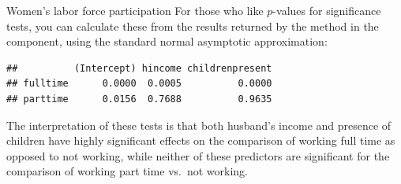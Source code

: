 \documentclass[11pt]{book}
\renewenvironment{knitrout}{\small\renewcommand{\baselinestretch}{.85}}{} %
\begin{document}
\begin{Example}[wlfpart2]{Women's labor force participation}
For those who like $p$-values for significance tests, you can calculate these from the
results returned by the  method in the  component,
using the standard normal asymptotic approximation:
\begin{knitrout}
\color{fgcolor}\begin{kframe}
\begin{alltt}
 \hlkwb{<-}  \hlstd{=}\hlstd{)}
 \hlkwb{<-} \hlopt{$}
 \hlkwb{<-}  \hlopt{*} \hlstd{(} \hlopt{-} \hlstd{(}
\end{alltt}
\begin{verbatim}
##          (Intercept) hincome childrenpresent
## fulltime      0.0000  0.0005          0.0000
## parttime      0.0156  0.7688          0.9635
\end{verbatim}
\end{kframe}
\end{knitrout}
The interpretation of these tests is that both husband's income and presence of
children have highly significant effects on the comparison of working full time
as opposed to not working, while neither of these predictors are significant
for the comparison of working part time vs.\  not working.


\end{Example}
\end{document}
